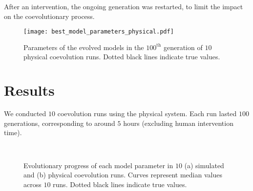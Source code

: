 After an intervention, the ongoing generation was restarted, to limit the impact on the coevolutionary process.


%
\begin{figure}[!t]
    \centering
    \texttt{[image: best\_model\_parameters\_physical.pdf]}
    \caption{Parameters of the evolved models in the $100^{\textrm{th}}$ generation of $10$ physical coevolution runs. Dotted black lines indicate true values.}
    \label{fig:best_model_parameters_physical}
\end{figure}
%
\section{Results}\label{sec:experimental_results_swarm_physical}
We conducted $10$ coevolution runs using the physical system. Each run lasted $100$ generations, corresponding to around $5$ hours (excluding human intervention time).
%
\begin{figure}[!t]%
	\centering
		\\
		\caption{Evolutionary progress of each model parameter in $10$ (a) simulated and (b) physical coevolution runs. Curves represent median values across $10$ runs. Dotted black lines indicate true values.}
		\label{fig:model_parameters_convergence_compare}
\end{figure}
%
